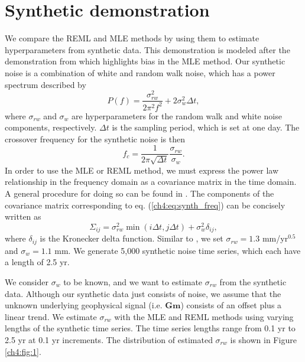 \section{Synthetic demonstration}\label{ch4:sec:3}
We compare the REML and MLE methods by using them to estimate
hyperparameters from synthetic data. This demonstration is modeled
after the demonstration from \citet{Langbein2012} which highlights
bias in the MLE method. Our synthetic noise is a combination of white
and random walk noise, which has a power spectrum described by
\begin{equation}\label{ch4:eq:synth_freq}
P(f) = \frac{\sigma_{rw}^2}{2\pi^2 f^2} + 2\sigma_w^2\Delta t,
\end{equation}  
where $\sigma_{rw}$ and $\sigma_w$ are hyperparameters for the random
walk and white noise components, respectively. $\Delta t$ is the
sampling period, which is set at one day. The crossover frequency for
the synthetic noise is then
\begin{equation}
f_c = \frac{1}{2\pi\sqrt{\Delta t}}\frac{\sigma_{rw}}{\sigma_w}.  
\end{equation}
In order to use the MLE or REML method, we must express the power law
relationship in the frequency domain as a covariance matrix in the
time domain. A general procedure for doing so can be found in
\citet{Langbein2004}. The components of the covariance matrix
corresponding to eq. (\ref{ch4:eq:synth_freq}) can be concisely
written as
\begin{equation}
\Sigma_{ij} = \sigma_{rw}^2 \min(i\Delta t,j\Delta t) + \sigma_w^2 \delta_{ij},
\end{equation} 
where $\delta_{ij}$ is the Kronecker delta function. Similar to
\citet{Langbein2012}, we set $\sigma_{rw} = 1.3$ mm/yr$^{0.5}$ and
$\sigma_w = 1.1$ mm. We generate 5,000 synthetic noise time series,
which each have a length of 2.5 yr.

We consider $\sigma_w$ to be known, and we want to estimate
$\sigma_{rw}$ from the synthetic data. Although our synthetic data
just consists of noise, we assume that the unknown underlying
geophysical signal (i.e. $\mathbf{G}\mathbf{m}$) consists of an offset
plus a linear trend. We estimate $\sigma_{rw}$ with the MLE and REML
methods using varying lengths of the synthetic time series. The time
series lengths range from 0.1 yr to 2.5 yr at 0.1 yr increments. The
distribution of estimated $\sigma_{rw}$ is shown in Figure
\ref{ch4:fig:1}.

